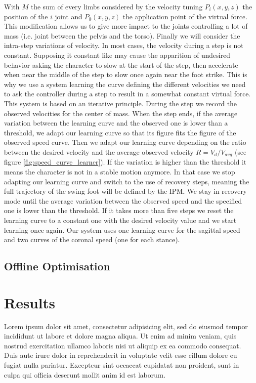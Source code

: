 \documentclass[conference]{acmsiggraph}
\begin{document}
 With \(M\) the sum of every limbs considered by the velocity tuning \(P_i(x,y,z)\) the position of the \(i\) joint and \(P_0(x,y,z)\) the application point of the virtual force. This modification allows us to give more impact to the joints controlling a lot of mass (i.e. joint between the pelvis and the torso). Finally we will consider the intra-step variations of velocity. In most cases, the velocity during a step is not constant. Supposing it constant like \cite{coros2010generalized} may cause the apparition of undesired behavior asking the character to slow at the start of the step, then accelerate when near the middle of the step to slow once again near the foot strike. This is why we use a system learning the curve defining the different velocities we need to ask the controller during a step to result in a somewhat constant virtual force. This system is based on an iterative principle. During the step we record the observed velocities for the center of mass. When the step ends, if the average variation between the learning curve and the observed one is lower than a threshold, we adapt our learning curve so that its figure fits the figure of the observed speed curve. Then we adapt our learning curve depending on the ratio between the desired velocity and the average observed velocity $R=V_d/V_{avg}$ (see figure \ref{fig:speed_curve_learner}). If the variation is higher than the threshold it means the character is not in a stable motion anymore. In that case we stop adapting our learning curve and switch to the use of recovery steps, meaning the full trajectory of the swing foot will be defined by the IPM. We stay in recovery mode until the average variation between the observed speed and the specified one is lower than the threshold. If it takes more than five steps we reset the learning curve to a constant one with the desired velocity value and we start learning once again. Our system uses one learning curve for the sagittal speed and two curves of the coronal speed (one for each stance).

\subsection{Offline Optimisation}
\label{sec:optimisation}


\section{Results}
\label{sec:results}

Lorem ipsum dolor sit amet, consectetur adipisicing elit, sed do
eiusmod tempor incididunt ut labore et dolore magna aliqua. Ut enim ad
minim veniam, quis nostrud exercitation ullamco laboris nisi ut
aliquip ex ea commodo consequat. Duis aute irure dolor in
reprehenderit in voluptate velit esse cillum dolore eu fugiat nulla
pariatur. Excepteur sint occaecat cupidatat non proident, sunt in
culpa qui officia deserunt mollit anim id est laborum.
\end{document}
